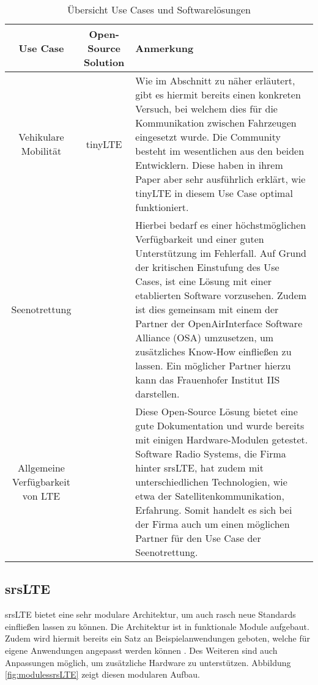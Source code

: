 \begin{table*}[htbp]
	 \centering
	\begin{tabularx} {\textwidth} {|c|c|X|} 
		\hline
		\textbf{Use Case} & \textbf{Open-Source Solution} & \textbf{Anmerkung}  \\
		\hline
		Vehikulare Mobilität & tinyLTE & Wie im Abschnitt zu \nameref{subsec:tinyLTE} näher erläutert, gibt es hiermit bereits einen konkreten Versuch, bei welchem dies für die Kommunikation zwischen Fahrzeugen eingesetzt wurde. Die Community besteht im wesentlichen aus den beiden Entwicklern. Diese haben in ihrem Paper aber sehr ausführlich erklärt, wie tinyLTE in diesem Use Case optimal funktioniert.\\
		\hline
		Seenotrettung & \nameref{OpenAirInterface} & Hierbei bedarf es einer höchstmöglichen Verfügbarkeit und einer guten Unterstützung im Fehlerfall. Auf Grund der kritischen Einstufung des Use Cases, ist eine Lösung mit einer etablierten Software vorzusehen. Zudem ist dies gemeinsam mit einem der Partner der OpenAirInterface Software Alliance (OSA) umzusetzen, um zusätzliches Know-How einfließen zu lassen. Ein möglicher Partner hierzu kann das Frauenhofer Institut IIS darstellen. \\
		\hline
		Allgemeine Verfügbarkeit von LTE & \nameref{srsLTE} & Diese Open-Source Lösung bietet eine gute Dokumentation und wurde bereits mit einigen Hardware-Modulen getestet. Software Radio Systems, die Firma hinter srsLTE, hat zudem mit unterschiedlichen Technologien, wie etwa der Satellitenkommunikation, Erfahrung. Somit handelt es sich bei der Firma auch um einen möglichen Partner für den Use Case der Seenotrettung. \\
		\hline
	\end{tabularx}
	\caption{Übersicht Use Cases und Softwarelösungen}

\end{table*}

\subsection{srsLTE}
\label{srsLTE}
srsLTE bietet eine sehr modulare Architektur, um auch rasch neue Standards einfließen lassen zu können. Die Architektur ist in funktionale Module aufgebaut. Zudem wird hiermit bereits ein Satz an Beispielanwendungen geboten, welche für eigene Anwendungen angepasst werden können \cite{puschmann2017implementing}. 
Des Weiteren sind auch Anpassungen möglich, um zusätzliche Hardware zu unterstützen. 
Abbildung \ref{fig:modulessrsLTE} zeigt diesen modularen Aufbau.

